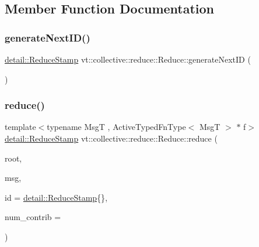 \subsection{Member Function Documentation}
\mbox{\label{structvt_1_1collective_1_1reduce_1_1_reduce_ac279b15e3bb5754d03307e2fe23ec734}} 
\subsubsection{\texorpdfstring{generate\+Next\+I\+D()}{generateNextID()}}
{\footnotesize\ttfamily \hyperlink{namespacevt_1_1collective_1_1reduce_1_1detail_aacc1fcd729d934ba143fee3a943bf9e7}{detail\+::\+Reduce\+Stamp} vt\+::collective\+::reduce\+::\+Reduce\+::generate\+Next\+ID (\begin{DoxyParamCaption}{ }\end{DoxyParamCaption})}

\mbox{\label{structvt_1_1collective_1_1reduce_1_1_reduce_ac41b433147b957df5639d72ac8946090}} 
\subsubsection{\texorpdfstring{reduce()}{reduce()}\hspace{0.1cm}{\footnotesize\ttfamily [1/3]}}
{\footnotesize\ttfamily template$<$typename MsgT , Active\+Typed\+Fn\+Type$<$ Msg\+T $>$ $\ast$ f$>$ \\
\hyperlink{namespacevt_1_1collective_1_1reduce_1_1detail_aacc1fcd729d934ba143fee3a943bf9e7}{detail\+::\+Reduce\+Stamp} vt\+::collective\+::reduce\+::\+Reduce\+::reduce (\begin{DoxyParamCaption}\item[{\hyperlink{namespacevt_a866da9d0efc19c0a1ce79e9e492f47e2}{Node\+Type}}]{root,  }\item[{MsgT $\ast$const}]{msg,  }\item[{\hyperlink{namespacevt_1_1collective_1_1reduce_1_1detail_aacc1fcd729d934ba143fee3a943bf9e7}{detail\+::\+Reduce\+Stamp}}]{id = {\ttfamily \hyperlink{namespacevt_1_1collective_1_1reduce_1_1detail_aacc1fcd729d934ba143fee3a943bf9e7}{detail\+::\+Reduce\+Stamp}\{\}},  }\item[{\hyperlink{structvt_1_1collective_1_1reduce_1_1_reduce_a6c3e63aca10c31d2823b0b18cf9762a4}{Reduce\+Num\+Type}}]{num\+\_\+contrib = {} }\end{DoxyParamCaption})}



